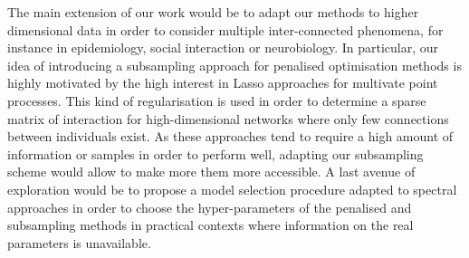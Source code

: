     The main extension of our work would be to adapt our methods to higher dimensional data in order to consider multiple inter-connected phenomena, for instance in epidemiology, social interaction or neurobiology.
    In particular, our idea of introducing a subsampling approach for penalised optimisation methods is highly motivated by the high interest in Lasso approaches for multivate point processes.
    This kind of regularisation is used in order to determine a sparse matrix of interaction for high-dimensional networks where only few connections between individuals exist.
    As these approaches tend to require a high amount of information or samples in order to perform well, adapting our subsampling scheme would allow to make more them more accessible.
    A last avenue of exploration would be to propose a model selection procedure adapted to spectral approaches in order to choose the hyper-parameters of the penalised and subsampling methods in practical contexts where information on the real parameters is unavailable.



